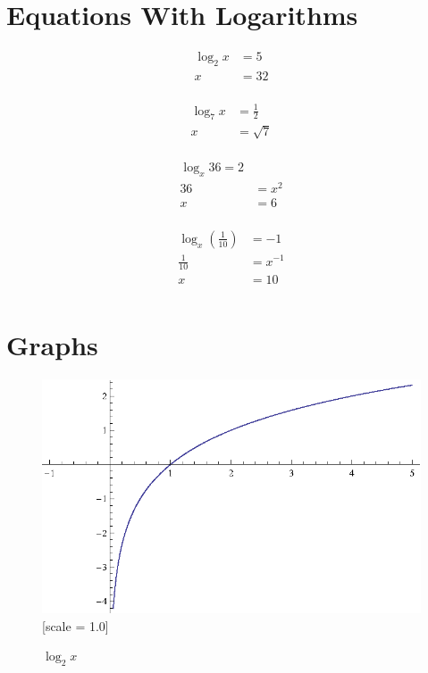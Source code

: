 \documentclass{exam}
\begin{document}
  \section{Equations With Logarithms}
  \begin{align*}
    \log_2 x &= 5 \\
    x        &= 32 \\
  \end{align*}
  
  \begin{align*}
    \log_7 x &= \frac{1}{2} \\
    x        &= \sqrt{7} \\
  \end{align*}

  \begin{align*}
    \log_x 36 = 2 \\
    36               &= x^2 \\
    x                &= 6 \\
  \end{align*}

  \begin{align*}
    \log_x \left( \frac{1}{10} \right) &= -1 \\
    \frac{1}{10}                       &= x^{-1} \\
    x                                  &= 10 \\
  \end{align*}

  \section{Graphs}

  \begin{figure}[H]
    \centering
    \includegraphics{figure1.eps}[scale = 1.0]
    \caption{$\log_2 x$}
  \end{figure}
\end{document}
